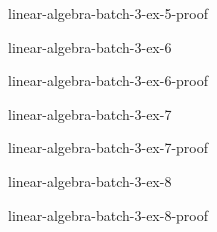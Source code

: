 \documentclass[preview]{standalone}
\begin{document}
\begin{snippetsolution}{linear-algebra-batch-3-ex-5-proof}{}
    \todo
\end{snippetsolution}

\begin{snippetexercise}{linear-algebra-batch-3-ex-6}{}
    \todo
\end{snippetexercise}

\begin{snippetsolution}{linear-algebra-batch-3-ex-6-proof}{}
    \todo
\end{snippetsolution}

\begin{snippetexercise}{linear-algebra-batch-3-ex-7}{}
    \todo
\end{snippetexercise}

\begin{snippetsolution}{linear-algebra-batch-3-ex-7-proof}{}
    \todo
\end{snippetsolution}

\begin{snippetexercise}{linear-algebra-batch-3-ex-8}{}
    \todo
\end{snippetexercise}

\begin{snippetsolution}{linear-algebra-batch-3-ex-8-proof}{}
    \todo
\end{snippetsolution}
\end{document}
